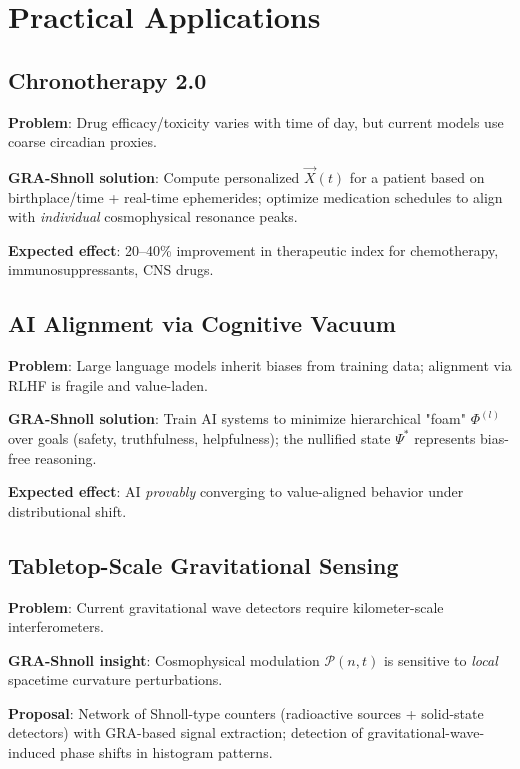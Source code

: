\documentclass[12pt,a4paper]{article}
\theoremstyle{plain}
\theoremstyle{definition}
\theoremstyle{remark}
\newcommand{\vX}{\vec{X}}
\begin{document}
\section{Practical Applications}
\label{sec:applications}

\subsection{Chronotherapy 2.0}
\textbf{Problem}: Drug efficacy/toxicity varies with time of day, but current models use coarse circadian proxies.

\textbf{GRA-Shnoll solution}: Compute personalized $\vX(t)$ for a patient based on birthplace/time + real-time ephemerides; optimize medication schedules to align with \emph{individual} cosmophysical resonance peaks.

\textbf{Expected effect}: 20--40\% improvement in therapeutic index for chemotherapy, immunosuppressants, CNS drugs.

\subsection{AI Alignment via Cognitive Vacuum}
\textbf{Problem}: Large language models inherit biases from training data; alignment via RLHF is fragile and value-laden.

\textbf{GRA-Shnoll solution}: Train AI systems to minimize hierarchical "foam" $\Phi^{(l)}$ over goals (safety, truthfulness, helpfulness); the nullified state $\Psi^*$ represents bias-free reasoning.

\textbf{Expected effect}: AI \emph{provably} converging to value-aligned behavior under distributional shift.

\subsection{Tabletop-Scale Gravitational Sensing}
\textbf{Problem}: Current gravitational wave detectors require kilometer-scale interferometers.

\textbf{GRA-Shnoll insight}: Cosmophysical modulation $\mathcal{P}(n,t)$ is sensitive to \emph{local} spacetime curvature perturbations.

\textbf{Proposal}: Network of Shnoll-type counters (radioactive sources + solid-state detectors) with GRA-based signal extraction; detection of gravitational-wave-induced phase shifts in histogram patterns.
\end{document}
